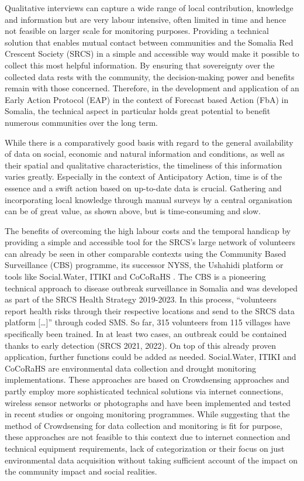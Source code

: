 Qualitative interviews can capture a wide range of local contribution, knowledge and information but are very labour intensive, often limited in time and hence not feasible on larger scale for monitoring purposes. Providing a technical solution that enables mutual contact between communities and the Somalia Red Crescent Society (SRCS) in a simple and accessible way would make it possible to collect this most helpful information. By ensuring that sovereignty over the collected data rests with the community, the decision-making power and benefits remain with those concerned. Therefore, in the development and application of an Early Action Protocol (EAP) in the context of Forecast based Action (FbA) in Somalia, the technical aspect in particular holds great potential to benefit numerous communities over the long term.

While there is a comparatively good basis with regard to the general availability of data on social, economic and natural information and conditions, as well as their spatial and qualitative characteristics, the timeliness of this information varies greatly. Especially in the context of Anticipatory Action, time is of the essence and a swift action based on up-to-date data is crucial. Gathering and incorporating local knowledge through manual surveys by a central organisation can be of great value, as shown above, but is time-consuming and slow.

The benefits of overcoming the high labour costs and the temporal handicap by providing a simple and accessible tool for the SRCS’s large network of volunteers can already be seen in other comparable contexts using the Community Based Surveillance (CBS) programme, its successor NYSS, the Ushahidi platform or tools like Social.Water, ITIKI and CoCoRaHS \autocite{fienenSocialWaterCrowdsourcing2012a} . The CBS is a pioneering technical approach to disease outbreak surveillance in Somalia and was developed as part of the SRCS Health Strategy 2019-2023. In this process, “volunteers report health risks through their respective locations and send to the SRCS data platform […]” \autocite[57]{somaliredcrescentsocietyFeasibilityStudyPotential2022} through coded SMS. So far, 315 volunteers from 115 villages have specifically been trained. In at least two cases, an outbreak could be contained thanks to early detection (SRCS 2021, 2022). On top of this already proven application, further functions could be added as needed.
Social.Water, ITIKI and CoCoRaHS are environmental data collection and drought monitoring implementations. These approaches are based on Crowdsensing approaches and partly employ more sophisticated technical solutions via internet connections, wireless sensor networks or photographs and have been implemented and tested in recent studies or ongoing monitoring programmes. While suggesting that the method of Crowdsensing for data collection and monitoring is fit for purpose, these approaches are not feasible to this context due to internet connection and technical equipment requirements, lack of categorization or their focus on just environmental data acquisition without taking sufficient account of the impact on the community impact and social realities.

